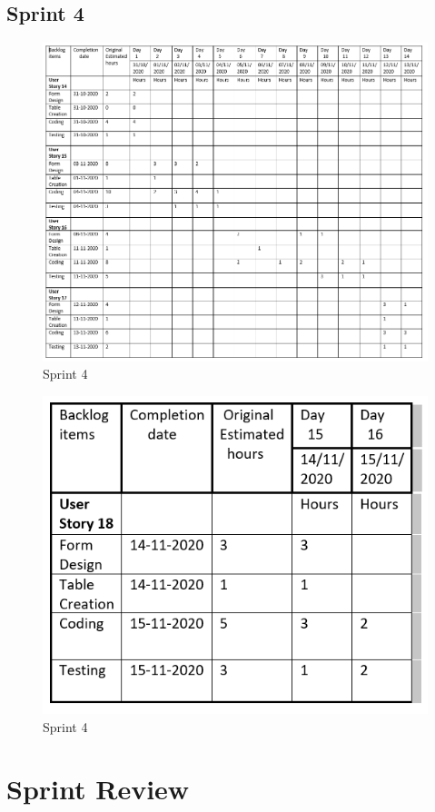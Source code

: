 \documentclass[a4paper,12pt]{report}
\begin{document}
\subsection {Sprint 4}
\begin{figure}[bph]
	\centering
	\includegraphics[width=0.9\linewidth]{img/sprint/sp4a1}
	\caption{Sprint 4}
\end{figure}
\pagebreak
\begin{figure}[bph]
	\centering
	\includegraphics[width=0.5\linewidth]{img/sprint/sp4a2}
	\caption{Sprint 4}
\end{figure}
\section{Sprint Review}
\end{document}
